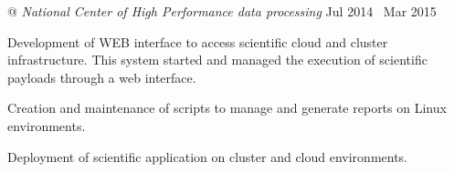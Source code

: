  @ \textit{National Center of High Performance data processing} \dotfill \enspace Jul 2014 \textemdash\  Mar 2015
\begin{minipage}[t]{\lcolwidth}
\raggedright
{\small \begin{zitemize}
  \item Development of WEB interface to access scientific cloud and cluster infrastructure. This system started and managed the execution of scientific payloads through a web interface.

  \item Creation and maintenance of scripts to manage and generate reports on Linux environments.

  \item Deployment of scientific application on cluster and cloud environments.
\end{zitemize}}
\end{minipage}%
\begin{minipage}[t]{\rcolwidth}
\raggedleft
{}
\end{minipage}

\vspace{-.25em}

